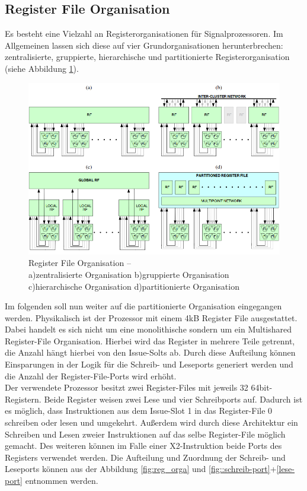 \subsection{Register File Organisation}
Es besteht eine Vielzahl an Registerorganisationen für Signalprozessoren. Im Allgemeinen lassen sich diese auf vier Grundorganisationen herunterbrechen: zentralisierte, gruppierte, hierarchische und partitionierte Registerorganisation (siehe Abbildung \ref{fig:RegisterOrga}).\newline
\begin{figure}[htbp] 
	\centering
	\includegraphics[width=\textwidth]{fig/Register_orga.png}
	\caption{Register File Organisation –\\ a)zentralisierte Organisation b)gruppierte Organisation c)hierarchische Organisation d)partitionierte Organisation  \cite{paya2010multi}}
	\label{fig:RegisterOrga}
\end{figure}
\newline
Im folgenden soll nun weiter auf die partitionierte Organisation eingegangen werden. Physikalisch ist der Prozessor mit einem 4kB Register File ausgestattet. Dabei handelt es sich nicht um eine monolithische sondern um ein Multishared Register-File Organisation. Hierbei wird das Register in mehrere Teile getrennt, die Anzahl hängt hierbei von den Issue-Solts ab. Durch diese Aufteilung können Einsparungen in der Logik für die Schreib- und Leseports generiert werden und die Anzahl der Register-File-Ports wird erhöht.\\
Der verwendete Prozessor besitzt zwei Register-Files mit jeweils 32 64bit-Registern. Beide Register weisen zwei Lese und vier Schreibports auf. Dadurch ist es möglich, dass Instruktionen aus dem Issue-Slot 1 in das Register-File 0 schreiben oder lesen und umgekehrt. Außerdem wird durch diese Architektur ein Schreiben und Lesen zweier Instruktionen auf das selbe Register-File möglich gemacht. Des weiteren können im Falle einer X2-Instruktion beide Ports des Registers verwendet werden. Die Aufteilung und  Zuordnung der Schreib- und Leseports können aus der Abbildung \ref{fig:reg_orga} und \ref{fig::schreib-port}+\ref{lese-port} entnommen werden.


